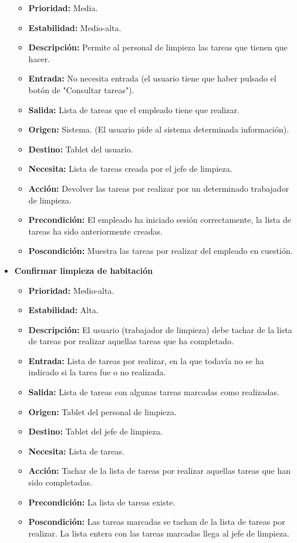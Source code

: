 \documentclass[spanish,a4paper,11pt, twoside]{report}	%
\begin{document}
\begin{itemize}
\begin{itemize}
			\item \textbf{Prioridad: }Media.
			\item \textbf{Estabilidad: }Medio-alta.
			\item \textbf{Descripción: }Permite al personal de limpieza las tareas que tienen que hacer.
			\item \textbf{Entrada: }No necesita entrada (el usuario tiene que haber pulsado el botón de "Consultar tareas").
			\item \textbf{Salida: }Lista de tareas que el empleado tiene que realizar.
			\item \textbf{Origen: }Sistema. (El usuario pide al sistema determinada información).
			\item \textbf{Destino: }Tablet del usuario.
			\item \textbf{Necesita: }Lista de tareas creada por el jefe de limpieza.
			\item \textbf{Acción: }Devolver las tareas por realizar por un determinado trabajador de limpieza.
			\item \textbf{Precondición: }El empleado ha iniciado sesión correctamente, la lista de tareas ha sido anteriormente creadas.
			\item \textbf{Poscondición: }Muestra las tareas por realizar del empleado en cuestión.

		\end{itemize}%

\item \textbf{Confirmar limpieza de habitación} %

		\begin{itemize}

			\item \textbf{Prioridad: }Medio-alta.
			\item \textbf{Estabilidad: }Alta.
			\item \textbf{Descripción: }El usuario (trabajador de limpieza) debe tachar de la lista de tareas por realizar aquellas tareas que ha completado.
			\item \textbf{Entrada: }Lista de tareas por realizar, en la que todavía no se ha indicado si la tarea fue o no realizada.
			\item \textbf{Salida: }Lista de tareas con algunas tareas marcadas como realizadas.
			\item \textbf{Origen: }Tablet del personal de limpieza.
			\item \textbf{Destino: }Tablet del jefe de limpieza.
			\item \textbf{Necesita: }Lista de tareas.
			\item \textbf{Acción: }Tachar de la lista de tareas por realizar aquellas tareas que han sido completadas.
			\item \textbf{Precondición: }La lista de tareas existe.
			\item \textbf{Poscondición: }Las tareas marcadas se tachan de la lista de tareas por realizar. La lista entera con las tareas marcadas llega al jefe de limpieza.


\end{itemize}
\end{itemize}
\end{document}
